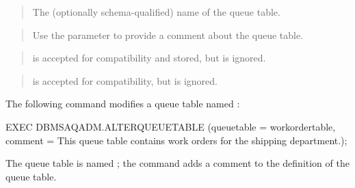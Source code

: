 \documentclass[letterpaper,10pt,english,openany,oneside]{sphinxmanual}
\begin{document}

\begin{quote}

The (optionally schema-qualified) name of the queue table.
\end{quote}

\begin{quote}

Use the  parameter to provide a comment about the queue
table.
\end{quote}

\begin{quote}

 is accepted for compatibility and stored, but is
ignored.
\end{quote}

\begin{quote}

 is accepted for compatibility, but is ignored.
\end{quote}


The following command modifies a queue table named :

%
\begin{sphinxVerbatim}[commandchars=\\\{\}]
EXEC DBMS\PYGZus{}AQADM.ALTER\PYGZus{}QUEUE\PYGZus{}TABLE
      (queue\PYGZus{}table =\PYGZgt{} \PYGZsq{}work\PYGZus{}order\PYGZus{}table\PYGZsq{}, comment =\PYGZgt{} \PYGZsq{}This queue table
contains work orders for the shipping department.\PYGZsq{});
\end{sphinxVerbatim}

The queue table is named ; the command adds a comment
to the definition of the queue table.

\newpage
\end{document}
